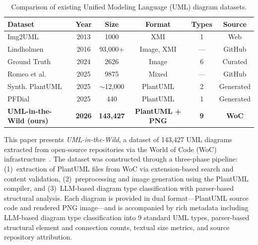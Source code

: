 \documentclass[11pt]{article}
\begin{document}
\begin{table}[H]
\caption{Comparison of existing Unified Modeling Language (UML) diagram datasets.\label{tab:dataset-comparison}}
\begin{tabularx}{\textwidth}{lCCCCC}
\toprule
\textbf{Dataset} & \textbf{Year} & \textbf{Size} & \textbf{Format} & \textbf{Types} & \textbf{Source} \\
\midrule
Img2UML \cite{karasneh2013img2uml}          & 2013 & 1000        & XMI             & 1        & Web \\
Lindholmen \cite{hebig2016quest,robles2017extensive} & 2016 & 93,000+     & Image, XMI      & ---       & GitHub \\
Ground Truth \cite{groundtruth2024}          & 2024 & 2626        & Image           & 6        & Curated \\
Romeo et al. \cite{romeo2025uml}             & 2025 & 9875        & Mixed           & ---      & GitHub \\
Synth. PlantUML \cite{bates2025umlcodegen}     & 2025 & $\sim$12,000 & PlantUML       & 2        & Generated \\
PFDial \cite{pfdial2025}                     & 2025 & 440         & PlantUML        & 1        & Generated \\
\textbf{UML-in-the-Wild (ours)}              & \textbf{2026} & \textbf{143,427} & \textbf{PlantUML + PNG} & \textbf{9} & \textbf{WoC} \\
\bottomrule
\end{tabularx}
\end{table}

This paper presents \emph{UML-in-the-Wild}, a dataset of 143,427 UML diagrams extracted from open-source repositories via the World of Code (WoC) infrastructure~\cite{ma2021world}. The dataset was constructed through a three-phase pipeline: (1)~extraction of PlantUML files from WoC via extension-based search and content validation, (2)~preprocessing and image generation using the PlantUML compiler, and (3)~LLM-based diagram type classification with parser-based structural analysis. Each diagram is provided in dual format---PlantUML source code and rendered PNG image---and is accompanied by rich metadata including LLM-based diagram type classification into 9 standard UML types, parser-based structural element and connection counts, textual size metrics, and source repository attribution.
\end{document}
